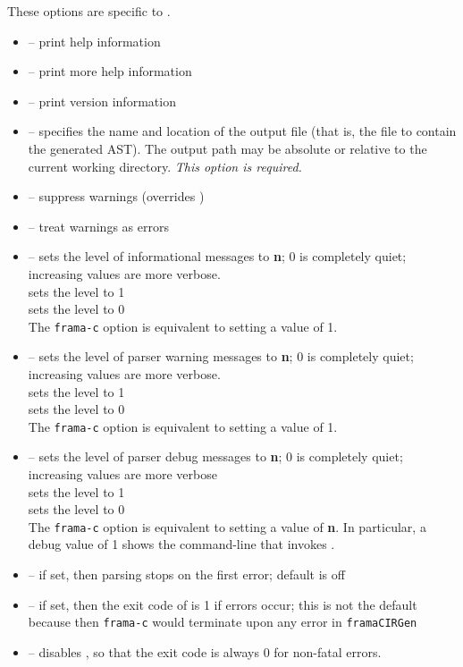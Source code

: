 These options are specific to \irg.
\begin{itemize}
	\item {} -- print help information
	\item {} -- print more help information
	\item {} -- print version information
	\item {} -- specifies the name and location of the output file (that is, the file to contain the generated AST). The output path may be absolute or relative to the current working directory. \textit{This option is required.}
	\item {} -- suppress warnings (overrides )
	\item {} -- treat warnings as errors 
	\item {} -- sets the level of informational messages to \textbf{n}; 0 is completely quiet; increasing values are
	more verbose. \\
	 sets the level to 1 \\
	 sets the level to 0\\
	 The \lstinline|frama-c| option  is equivalent to setting a value of 1.
	
	\item {} -- sets the level of parser warning messages to \textbf{n}; 0 is completely quiet; increasing values are
more verbose.\\
  sets the level to 1\\
 sets the level to 0\\
The \lstinline|frama-c| option  is equivalent to setting a value of 1.

	\item {} -- sets the level of parser debug messages to \textbf{n}; 0 is completely quiet; increasing values are
more verbose\\
  sets the level to 1\\
 sets the level to 0\\
The \lstinline|frama-c| option  is equivalent to setting a value of \textbf{n}.
In particular, a debug value of 1 shows the command-line that invokes \irg.

	\item {} -- if set, then parsing stops on the first error; default is off
	\item {} -- if set, then the exit code of \irg is 1 if errors occur; this is not the default because then \lstinline|frama-c| would terminate upon
	any error in \lstinline|framaCIRGen|
	\item {} -- disables , so that the exit code is always 0 for non-fatal errors.


\end{itemize}
